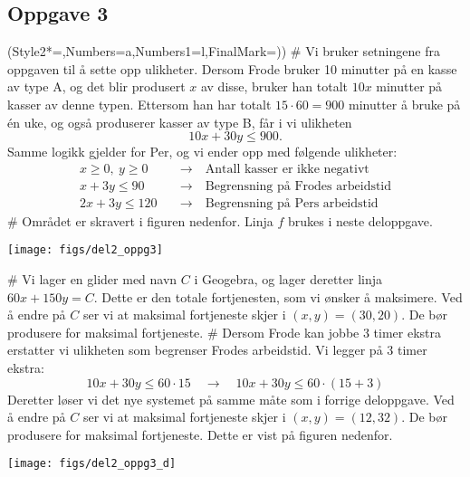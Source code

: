 \subsection*{Oppgave 3}
\begin{easylist}[enumerate]
	\ListProperties(Style2*=,Numbers=a,Numbers1=l,FinalMark={)})
	# Vi bruker setningene fra oppgaven til å sette opp ulikheter. Dersom Frode bruker 10 minutter på en kasse av type A, og det blir produsert $x$ av disse, bruker han totalt $10x$ minutter på kasser av denne typen. Ettersom han har totalt $15 \cdot 60 = 900$ minutter å bruke på én uke, og også produserer kasser av type B, får i vi ulikheten
	\begin{equation*}
		10x + 30 y \leq 900.
	\end{equation*}
	Samme logikk gjelder for Per, og vi ender opp med følgende ulikheter:
	\begin{align*}
		x \geq 0, \ y \geq 0 & \quad \rightarrow \quad \text{Antall kasser er ikke negativt} \\
		x + 3y \leq 90 & \quad \rightarrow \quad \text{Begrensning på Frodes arbeidstid} \\
		2x + 3y \leq 120 & \quad \rightarrow \quad \text{Begrensning på Pers arbeidstid}
	\end{align*}
	# Området er skravert i figuren nedenfor. Linja $f$ brukes i neste deloppgave.
	\begin{center}
		\texttt{[image: figs/del2\_oppg3]}
	\end{center}
	# Vi lager en glider med navn $C$ i Geogebra, og lager deretter linja $60x + 150 y = C$. Dette er den totale fortjenesten, som vi ønsker å maksimere. Ved å endre på $C$ ser vi at maksimal fortjeneste skjer i $(x, y) = (30, 20)$. De bør produsere  for maksimal fortjeneste.
	# Dersom Frode kan jobbe 3 timer ekstra erstatter vi ulikheten som begrenser Frodes arbeidstid. Vi legger på 3 timer ekstra:
	\begin{equation*}
		10x + 30y \leq 60 \cdot 15 \quad \rightarrow \quad10x + 30y \leq 60 \cdot (15 + 3)
	\end{equation*}
	Deretter løser vi det nye systemet på samme måte som i forrige deloppgave. Ved å endre på $C$ ser vi at maksimal fortjeneste skjer i $(x, y) = (12, 32)$. De bør produsere  for maksimal fortjeneste. Dette er vist på figuren nedenfor.
	
	\begin{center}
		\texttt{[image: figs/del2\_oppg3\_d]}
	\end{center}
\end{easylist}

